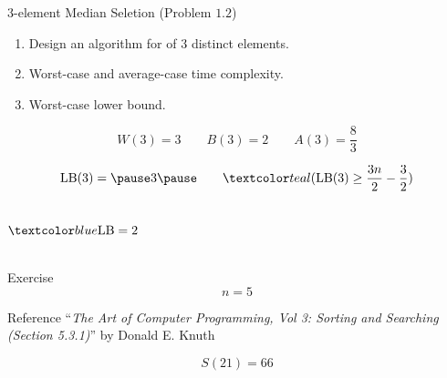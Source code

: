 \begin{frame}{}
  \begin{exampleblock}{$3$-element Median Seletion (Problem $1.2$)}
    \begin{enumerate}[(1)]
      \item Design an algorithm for  of $3$ distinct elements.
      \item Worst-case and average-case time complexity.
      \item Worst-case lower bound.
    \end{enumerate}
  \end{exampleblock}

  \pause

  \pause
  \vspace{-0.30cm}
  \[
    W(3) = 3 \qquad B(3) = 2 \qquad A(3) = \frac{8}{3}
  \]

  \pause
  \vspace{-0.30cm}
  \[
    \text{LB}(3) =\pause 3 \pause \qquad \teal{(\text{LB}(3) \ge \frac{3n}{2} - \frac{3}{2})}
  \]
\end{frame}

\begin{frame}{}
  \begin{columns}
      \[
	\blue{\text{LB} = 2}
      \]
      \pause
      
  \end{columns}

  \pause
  \vspace{0.60cm}
  \centerline{}
\end{frame}

\begin{frame}{}
  \begin{exampleblock}{Exercise}
    \[
      n = 5
    \]
  \end{exampleblock}

  \pause
  \vspace{0.80cm}
  \begin{alertblock}{Reference}
    ``{\it The Art of Computer Programming, Vol 3: Sorting and Searching (Section 5.3.1)}'' by Donald E. Knuth
  \end{alertblock}

  \[
    S(21) = 66
  \]
\end{frame}
